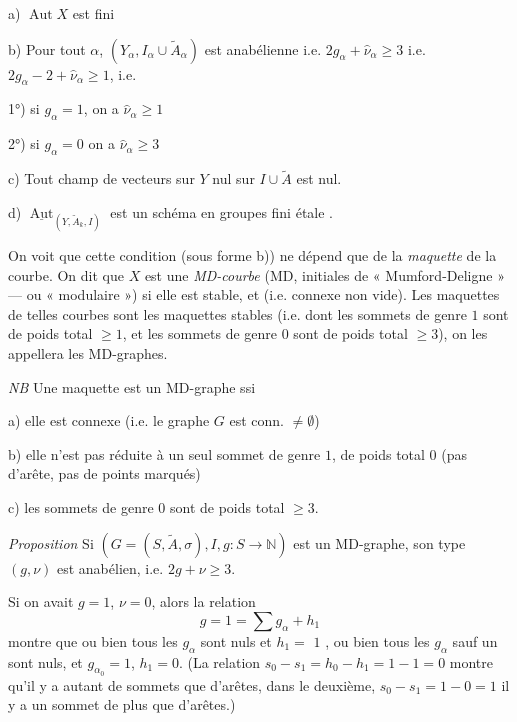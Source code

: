 \documentclass[11pt,a4paper]{article}
\begin{document}
a) $\operatorname{Aut} X$ est fini

b) Pour tout $\alpha$, $(Y_{\alpha}, I_{\alpha} \cup \widetilde{A}_{\alpha})$ est anabélienne i.e. $2g_{\alpha} + \widehat{\nu}_{\alpha} \geq 3$ i.e. $2g_{\alpha} - 2 + \widehat{\nu}_{\alpha} \geq 1$, i.e.

1°) si $g_{\alpha} = 1$, on a $\widehat{\nu}_{\alpha} \geq 1$

2°) si $g_{\alpha} = 0$ on a $\widehat{\nu}_{\alpha} \geq 3$

c) Tout champ de vecteurs sur $Y$ nul sur \struck{\ill{}} $I \cup \widetilde{A}$ est nul.

d) $\underline{\operatorname{Aut}}_{(Y, \widetilde{A}_{k}, I)}$ est un schéma en groupes fini étale .

On voit que cette condition (sous forme b)) ne dépend que de la \emph{maquette} de la courbe. On dit que $X$ est une \emph{MD-courbe} (MD, initiales de « Mumford-Deligne » — ou « modulaire ») si elle est stable, et  (i.e. connexe non vide). Les maquettes de telles courbes sont les maquettes  stables (i.e. dont les sommets de genre $1$ sont de poids total $\geq 1$, et les sommets de genre $0$ sont de poids total $\geq 3$), on les appellera les MD-graphes.

\emph{NB} Une maquette est un MD-graphe ssi

a) elle est connexe (i.e. le graphe $G$ est conn. $\neq \emptyset$)

b) elle n'est pas réduite à un seul sommet de genre $1$, de poids total $0$ (pas d'arête, pas de points marqués)

c) les sommets de genre $0$ sont de poids total $\geq 3$.


\emph{Proposition} Si $(G = (S, \widetilde{A}, \sigma), I, g : S \to \mathbb{N})$ est un MD-graphe, son type $(g, \nu)$ est anabélien, i.e. $2g + \nu \geq 3$.

Si on avait $g = 1$, $\nu = 0$, alors la relation
\[
g = 1 = \sum g_{\alpha} + h_{1}
\]
montre que ou bien tous les $g_{\alpha}$ sont nuls et $h_{1} =$  $1$ , ou bien tous les $g_{\alpha}$ sauf un  sont nuls, et $g_{\alpha_{0}} = 1$, $h_{1} = 0$.  (La relation $s_{0} - s_{1} = h_{0} - h_{1} = 1 - 1 = 0$ montre qu'il y a autant de sommets que d'arêtes, dans le deuxième, $s_{0} - s_{1} = 1 - 0 = 1$ il y a un sommet de plus que d'arêtes.)
\end{document}
